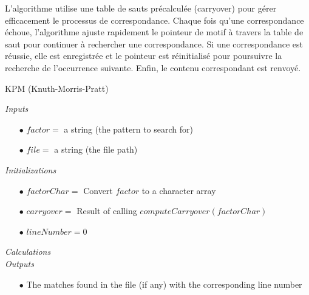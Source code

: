 \documentclass[11pt,english]{article}
\begin{document}
{    \indent L'algorithme utilise une table de sauts précalculée (carryover) pour gérer efficacement le processus de correspondance. Chaque fois qu'une correspondance échoue, l'algorithme ajuste rapidement le pointeur de motif à travers la table de saut pour continuer à rechercher une correspondance. Si une correspondance est réussie, elle est enregistrée et le pointeur est réinitialisé pour poursuivre la recherche de l'occurrence suivante. Enfin, le contenu correspondant est renvoyé.

    \indent 

    \begin{algorithm}[H]
        \caption{KPM (Knuth-Morris-Pratt)}\label{alg:kpm}
        \textit{Inputs}
        \begin{itemize}
            \item[$\bullet$] $factor = $ a string (the pattern to search for)
            \item[$\bullet$] $file = $ a string (the file path)
        \end{itemize}
        \textit{Initializations}
        \begin{itemize}
            \item[$\bullet$] $factorChar = $ Convert $factor$ to a character array
            \item[$\bullet$] $carryover = $ Result of calling $computeCarryover(factorChar)$
            \item[$\bullet$] $lineNumber = 0$
        \end{itemize}
        \textit{Calculations}\\
        \textit{Outputs}
        \begin{itemize}
            \item[$\bullet$] The matches found in the file (if any) with the corresponding line number
        \end{itemize}
    \end{algorithm}

}
\end{document}
